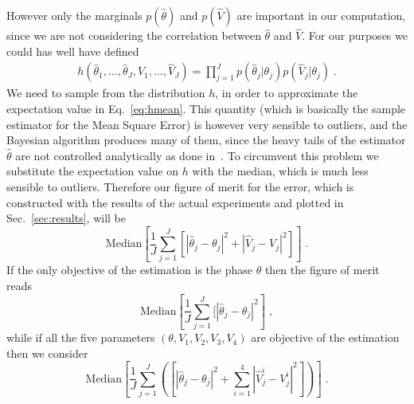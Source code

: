 \documentclass[aps, pra, 10pt, twocolumn, superscriptaddress,floatfix]{revtex4-1}
\begin{document}
However only the marginals $p(\hat{\theta})$ and $p(\hat{V})$ are important in our computation, since we are not considering the correlation between $\hat{\theta}$ and $\hat{V}$. For our purposes we could has well have defined
\begin{eqnarray}
	h(\hat{\theta}_1, \dots, \hat{\theta}_J, \hat{V}_1, \dots, \hat{V}_J) = \prod_{j=1}^J p(\hat{\theta}_j | \theta_j) p(\hat{V}_j | \theta_j) \; .
\end{eqnarray}
%
We need to sample from the distribution $h$, in order to approximate the expectation value in Eq.~\eqref{eq:hmean}. This quantity (which is basically the sample estimator for the Mean Square Error) is however very sensible to outliers, and the Bayesian algorithm produces many of them, since the heavy tails of the estimator $\hat{\theta}$ are not controlled analytically as done in~\cite{Cimini2021}. To circumvent this problem we substitute the expectation value on $h$ with the median, which is much less sensible to outliers. Therefore our figure of merit for the error, which is constructed with the results of the actual experiments and plotted in Sec.~\ref{sec:results}, will be  
%
\begin{equation}
	\text{Median} \left[ \frac{1}{J} \sum_{j=1}^J  [|\hat{\theta}_j-\theta_j|^2 + |\hat{V}_j-V_j|^2] \right] \; .
	\label{eq:medianMerit}
\end{equation}
%
If the only objective of the estimation is the phase $\theta$ then the figure of merit reads
%
\begin{equation}
	\text{Median} \left[ \frac{1}{J} \sum_{j=1}^J  [|\hat{\theta}_j-\theta_j|^2 \right] \; ,
	\label{eq:medianMeritOnlyTheta}
\end{equation}
%
while if all the five parameters $(\theta, V_1, V_2, V_3, V_4)$ are objective of the estimation then we consider
%
\begin{equation}
	\text{Median} \left[ \frac{1}{J} \sum_{j=1}^J \left( [|\hat{\theta}_j-\theta_j|^2 + \sum_{i=1}^4 |\hat{V}_j^i-V^i_j|^2] \right)\right] \; .
	\label{eq:medianMeritAll}
\end{equation}
\end{document}
